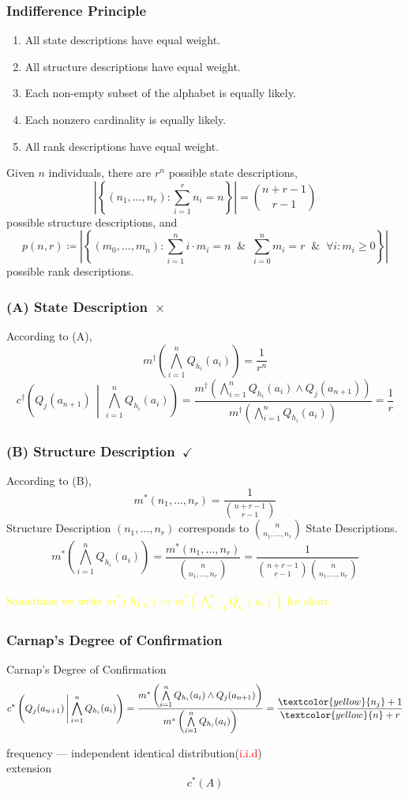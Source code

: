 \documentclass[UTF8,11pt,colorlinks,compress,openany]{beamer}%
\begin{document}
\begin{frame}\frametitle{Indifference Principle}
	\begin{enumerate}[A]
		\item All state descriptions have equal weight.
		\item All structure descriptions have equal weight.
		\item Each non-empty subset of the alphabet is equally
		likely.
		\item Each nonzero cardinality is equally likely.
		\item All rank descriptions have equal weight.
	\end{enumerate}
	Given $n$ individuals, there are $r^n$ possible state descriptions,
	\[\left|\left\{(n_1,\ldots,n_r): \sum\limits_{i=1}^r n_i=n\right\}\right|=\binom{n+r-1}{r-1}\]
	possible structure descriptions, and 
	\[p(n,r)\coloneqq \left|\left\{(m_0,\ldots,m_n): \sum\limits_{i=1}^n i\cdot m_i=n\;\;\&\;\;\sum\limits_{i=0}^n m_i=r\;\;\&\;\;\forall i: m_i\geq 0 \right\}\right|\]
	possible rank descriptions.
\end{frame}

\begin{frame}\frametitle{(A) State Description~$\times$}
	According to (A),
	\[m^\dagger\left(\bigwedge\limits_{i=1}^n Q_{h_i}(a_i)\right)=\dfrac{1}{r^n}\]
	\[c^\dagger\left(Q_j(a_{n+1})\,\middle|\,\bigwedge\limits_{i=1}^n Q_{h_i}(a_i)\right)=\dfrac{m^\dagger\left(\bigwedge\limits_{i=1}^n Q_{h_i}(a_i)\wedge Q_j(a_{n+1})\right)}{m^\dagger\left(\bigwedge\limits_{i=1}^n Q_{h_i}(a_i)\right)}=\dfrac{1}{r}\]
\end{frame}

\begin{frame}\frametitle{(B) Structure Description~$\checkmark$}
	According to (B),
	\[m^*(n_1,\ldots,n_r)=\frac{1}{\binom{n+r-1}{r-1}}\]
	Structure Description $(n_1,\ldots,n_r)$ corresponds to $\binom{n}{n_1,\ldots,n_r}$ State Descriptions.
	\[m^*\left(\bigwedge\limits_{i=1}^n Q_{h_i}(a_i)\right)=\dfrac{m^*(n_1,\ldots,n_r)}{\binom{n}{n_1,\ldots,n_r}}=\dfrac{1}{\binom{n+r-1}{r-1} \binom{n}{n_1,\ldots,n_r}}\]
	\begin{center}
		\textcolor{yellow}{Sometimes we write $m^*(h_{1:n})\coloneqq m^*\left(\bigwedge\limits_{i=1}^n Q_{h_i}(a_i)\right)$ for short.}
	\end{center}
\end{frame}

\begin{frame}\frametitle{Carnap's Degree of Confirmation}
	\begin{block}{Carnap's Degree of Confirmation}
		\[c^*\left(Q_j(a_{n+1})\,\middle|\,\bigwedge\limits_{i=1}^n Q_{h_i}(a_i)\right)=\frac{m^*\left(\bigwedge\limits_{i=1}^n Q_{h_i}(a_i)\wedge Q_j(a_{n+1})\right)}{m^*\left(\bigwedge\limits_{i=1}^n Q_{h_i}(a_i)\right)}=\frac{\textcolor{yellow}{n_j}+1}{\textcolor{yellow}{n}+r}\]
	\end{block}
	frequency --- independent identical distribution(\textcolor{red}{i.i.d})\\
	extension
	\[c^*(A)\]
\end{frame}
\end{document}
